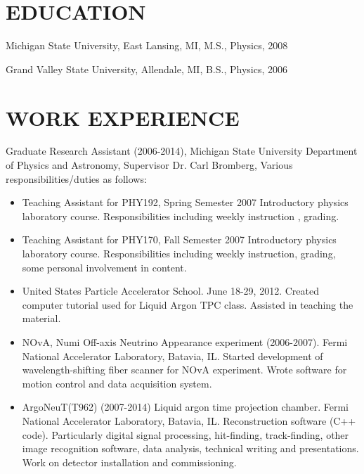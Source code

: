 \documentclass{res}
\begin{document}
 
\thispagestyle{empty} %
\address{3201 Lucie\\
Lansing, MI 48911\\
(517) 449 - 3129}


\begin{resume}
\vspace{0.1in}
	
\section{EDUCATION}
\vspace{0.1in}  
    
    Michigan State University, East Lansing, MI, M.S., Physics, 2008 
 
    Grand Valley State University, Allendale, MI, B.S., Physics, 
    2006 
 
\section{WORK EXPERIENCE}
\vspace{0.1in}
	Graduate Research Assistant (2006-2014), Michigan State University Department of Physics and Astronomy, Supervisor Dr. Carl Bromberg, Various responsibilities/duties as follows:
\vspace{0.1in}	
\begin{itemize}  \itemsep10pt
	\item	Teaching Assistant for PHY192, Spring Semester 2007 Introductory physics laboratory course. Responsibilities including weekly instruction , grading.
	
	\item   Teaching Assistant for PHY170, Fall Semester 2007 Introductory physics laboratory course. Responsibilities including weekly instruction, grading, some personal involvement in content.
	
	\item	United States Particle Accelerator School.  June 18-29, 2012. Created computer tutorial used for Liquid Argon TPC class.  Assisted in teaching the material. 
	
	\item	NOvA, Numi Off-axis Neutrino Appearance experiment (2006-2007).  Fermi National Accelerator Laboratory, Batavia, IL.  Started development of wavelength-shifting fiber scanner for NOvA experiment.  Wrote software for motion control and data acquisition system.
	
	\item	ArgoNeuT(T962) (2007-2014) Liquid argon time projection chamber. Fermi National Accelerator Laboratory, Batavia, IL.  Reconstruction software (C++ code).  Particularly  digital signal processing, hit-finding, track-finding, other image recognition software, data analysis, technical writing and presentations.  Work on detector installation and commissioning.  


\end{itemize}
\end{resume}
\end{document}

